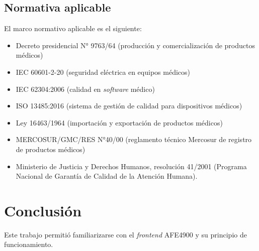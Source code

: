\documentclass[
    11pt,
    spanish,
	a4paper
]{article}
\begin{document}
\subsection{Normativa aplicable}
\label{subsec:normativa}

El marco normativo aplicable es el siguiente:

\begin{itemize}
    \item Decreto presidencial N° 9763/64 (producción y comercialización de productos médicos)
    \item IEC 60601-2-20 (seguridad eléctrica en equipos médicos)
    \item IEC 62304:2006 (calidad en \emph{software} médico)
    \item ISO 13485:2016 (sistema de gestión de calidad para dispositivos médicos)
    \item Ley 16463/1964 (importación y exportación de productos médicos)
    \item MERCOSUR/GMC/RES N°40/00 (reglamento técnico Mercosur de registro de productos médicos)
    \item Ministerio de Justicia y Derechos Humanos, resolución 41/2001 (Programa Nacional de Garantía de Calidad de la Atención Humana).
\end{itemize}

\section{Conclusión}
\label{suc:conclusion}

Este trabajo permitió familiarizarse con el \emph{frontend} AFE4900 y su principio de funcionamiento.
\end{document}
